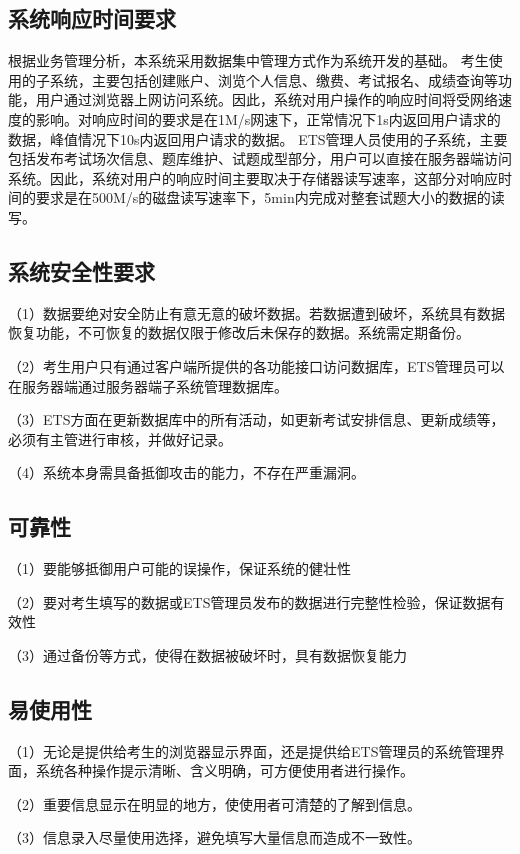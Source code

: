 \subsection{系统响应时间要求}
根据业务管理分析，本系统采用数据集中管理方式作为系统开发的基础。
考生使用的子系统，主要包括创建账户、浏览个人信息、缴费、考试报名、成绩查询等功能，用户通过浏览器上网访问系统。因此，系统对用户操作的响应时间将受网络速度的影响。对响应时间的要求是在1M/s网速下，正常情况下1s内返回用户请求的数据，峰值情况下10s内返回用户请求的数据。
ETS管理人员使用的子系统，主要包括发布考试场次信息、题库维护、试题成型部分，用户可以直接在服务器端访问系统。因此，系统对用户的响应时间主要取决于存储器读写速率，这部分对响应时间的要求是在500M/s的磁盘读写速率下，5min内完成对整套试题大小的数据的读写。

\subsection{系统安全性要求}
（1）数据要绝对安全防止有意无意的破坏数据。若数据遭到破坏，系统具有数据恢复功能，不可恢复的数据仅限于修改后未保存的数据。系统需定期备份。

（2）考生用户只有通过客户端所提供的各功能接口访问数据库，ETS管理员可以在服务器端通过服务器端子系统管理数据库。

（3）ETS方面在更新数据库中的所有活动，如更新考试安排信息、更新成绩等，必须有主管进行审核，并做好记录。

（4）系统本身需具备抵御攻击的能力，不存在严重漏洞。

\subsection{可靠性}
（1）要能够抵御用户可能的误操作，保证系统的健壮性

（2）要对考生填写的数据或ETS管理员发布的数据进行完整性检验，保证数据有效性

（3）通过备份等方式，使得在数据被破坏时，具有数据恢复能力

\subsection{易使用性}
（1）无论是提供给考生的浏览器显示界面，还是提供给ETS管理员的系统管理界面，系统各种操作提示清晰、含义明确，可方便使用者进行操作。

（2）重要信息显示在明显的地方，使使用者可清楚的了解到信息。

（3）信息录入尽量使用选择，避免填写大量信息而造成不一致性。

